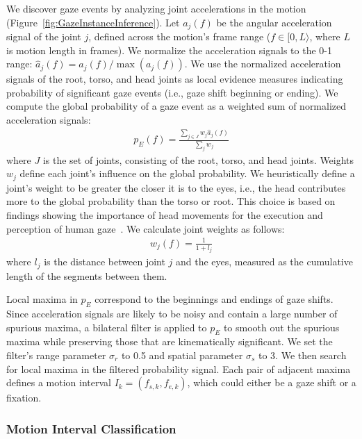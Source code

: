 We discover gaze events by analyzing joint accelerations in the motion (Figure~\ref{fig:GazeInstanceInference}). Let $a_j(f)$ be the angular acceleration signal of the joint $j$, defined across the motion's frame range ($f \in [0, L\rangle$, where $L$ is motion length in frames). We normalize the acceleration signals to the 0-1 range: $\hat{a}_j(f) = a_j(f) / \mathop{max}(a_j(f))$. We use the normalized acceleration signals of the root, torso, and head joints as local evidence measures indicating probability of significant gaze events (i.e., gaze shift beginning or ending). We compute the global probability of a gaze event as a weighted sum of normalized acceleration signals:
%
\begin{align} \label{eq:GazeEventProbability}
p_E(f) = \frac{\sum_{j \in J} w_j \hat{a}_j(f)}{\sum_j w_j}
\end{align}
%
where $J$ is the set of joints, consisting of the root, torso, and head joints. Weights $w_j$ define each joint's influence on the global probability. We heuristically define a joint's weight to be greater the closer it is to the eyes, i.e., the head contributes more to the global probability than the torso or root. This choice is based on findings showing the importance of head movements for the execution and perception of human gaze~\citep{hietanen1999does}. We calculate joint weights as follows:
%
\begin{align} \label{eq:GazeJointWeight}
w_j(f) = \frac{1}{1 + l_j}
\end{align}
%
where $l_j$ is the distance between joint $j$ and the eyes, measured as the cumulative length of the segments between them.

Local maxima in $p_E$ correspond to the beginnings and endings of gaze shifts. Since acceleration signals are likely to be noisy and contain a large number of spurious maxima, a bilateral filter is applied to $p_E$ to smooth out the spurious maxima while preserving those that are kinematically significant. We set the filter's range parameter $\sigma_r$ to 0.5 and spatial parameter $\sigma_s$ to 3. We then search for local maxima in the filtered probability signal. Each pair of adjacent maxima defines a motion interval $I_k = (f_{s,k}, f_{e,k})$, which could either be a gaze shift or a fixation.

\subsubsection{Motion Interval Classification}

